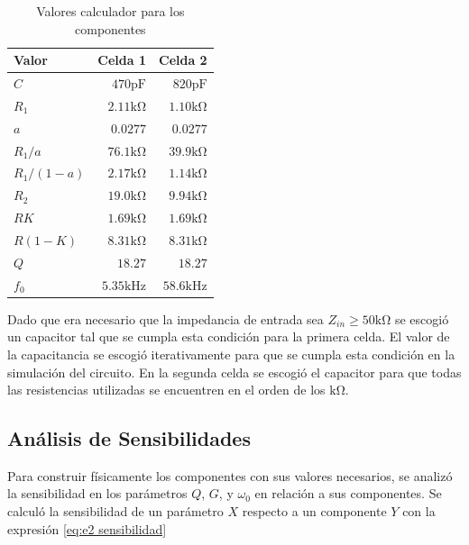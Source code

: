 \begin{table}[ht]
\begin{center}
\begin{tabular}{||l|r|r||}
\hline
Valor				&	Celda 1						&	Celda 2\\
\hline
\hline
$C$				&	$470 \si{\pico\farad}$	&	$820 \si{\pico\farad}$ \\
\hline
$R_1$			&	$2.11 \si{\kilo\ohm}$	&	$1.10 \si{\kilo\ohm}$	\\
$a$				&	$0.0277$					&	$0.0277$						\\
$R_1/a$			&	$76.1 \si{\kilo\ohm}$	&	$39.9 \si{\kilo\ohm}$	\\
$R_1/(1-a)$	&	$2.17 \si{\kilo\ohm}$	&	$1.14 \si{\kilo\ohm}$	\\
\hline
$R_2$			&	$19.0 \si{\kilo\ohm}$	&	$9.94 \si{\kilo\ohm}$	\\
\hline
$RK$				&	$1.69 \si{\kilo\ohm}$	&	$1.69 \si{\kilo\ohm}$	\\
$R(1-K)$		&	$8.31 \si{\kilo\ohm}$	&	$8.31 \si{\kilo\ohm}$	\\
\hline
$Q$				&	$18.27$						&	$18.27$						\\
$f_0$				&	$5.35 \si{\kilo\hertz}$	&	$58.6 \si{\kilo\hertz}$	\\
\hline
\end{tabular}
\caption{Valores calculador para los componentes}
\label{tab:e2 componentes teoricos}
\end{center}
\end{table}

Dado que era necesario que la impedancia de entrada sea $Z_{in} \geq 50 \si{\kilo\ohm}$ se escogió un capacitor tal que se cumpla esta condición para la primera celda. El valor de la capacitancia se escogió iterativamente para que se cumpla esta condición en la simulación del circuito. En la segunda celda se escogió el capacitor para que todas las resistencias utilizadas se encuentren en el orden de los $\si{\kilo\ohm}$.

\subsection{Análisis de Sensibilidades}

Para construir físicamente los componentes con sus valores necesarios, se analizó la sensibilidad en los parámetros $Q$, $G$, y $\omega_0$ en relación a sus componentes. Se calculó la sensibilidad de un parámetro $X$ respecto a un componente $Y$ con la expresión \eqref{eq:e2 sensibilidad}

